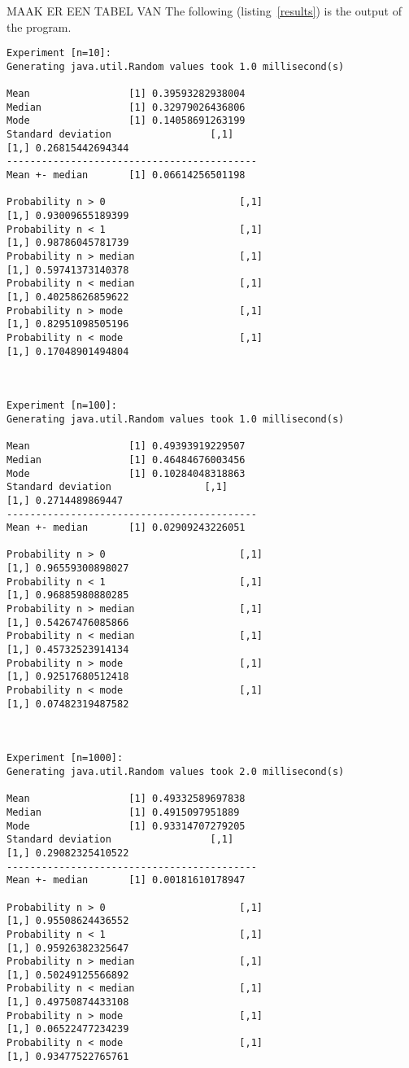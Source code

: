 \documentclass[
10pt, %
a4paper, %
oneside, %
headinclude,footinclude, %
BCOR5mm, %
]{scrartcl}
\begin{document}
MAAK ER EEN TABEL VAN
The following (listing~\ref{results}) is the output of the program.
\\
\begin{lstlisting}[language={},label=results,caption=Ouput of the program]
Experiment [n=10]: 
Generating java.util.Random values took 1.0 millisecond(s)

Mean                 [1] 0.39593282938004
Median               [1] 0.32979026436806
Mode                 [1] 0.14058691263199
Standard deviation                 [,1]
[1,] 0.26815442694344
-------------------------------------------
Mean +- median       [1] 0.06614256501198

Probability n > 0                       [,1]
[1,] 0.93009655189399
Probability n < 1                       [,1]
[1,] 0.98786045781739
Probability n > median                  [,1]
[1,] 0.59741373140378
Probability n < median                  [,1]
[1,] 0.40258626859622
Probability n > mode                    [,1]
[1,] 0.82951098505196
Probability n < mode                    [,1]
[1,] 0.17048901494804



Experiment [n=100]: 
Generating java.util.Random values took 1.0 millisecond(s)

Mean                 [1] 0.49393919229507
Median               [1] 0.46484676003456
Mode                 [1] 0.10284048318863
Standard deviation                [,1]
[1,] 0.2714489869447
-------------------------------------------
Mean +- median       [1] 0.02909243226051

Probability n > 0                       [,1]
[1,] 0.96559300898027
Probability n < 1                       [,1]
[1,] 0.96885980880285
Probability n > median                  [,1]
[1,] 0.54267476085866
Probability n < median                  [,1]
[1,] 0.45732523914134
Probability n > mode                    [,1]
[1,] 0.92517680512418
Probability n < mode                    [,1]
[1,] 0.07482319487582



Experiment [n=1000]: 
Generating java.util.Random values took 2.0 millisecond(s)

Mean                 [1] 0.49332589697838
Median               [1] 0.4915097951889
Mode                 [1] 0.93314707279205
Standard deviation                 [,1]
[1,] 0.29082325410522
-------------------------------------------
Mean +- median       [1] 0.00181610178947

Probability n > 0                       [,1]
[1,] 0.95508624436552
Probability n < 1                       [,1]
[1,] 0.95926382325647
Probability n > median                  [,1]
[1,] 0.50249125566892
Probability n < median                  [,1]
[1,] 0.49750874433108
Probability n > mode                    [,1]
[1,] 0.06522477234239
Probability n < mode                    [,1]
[1,] 0.93477522765761




\end{lstlisting}
\end{document}

